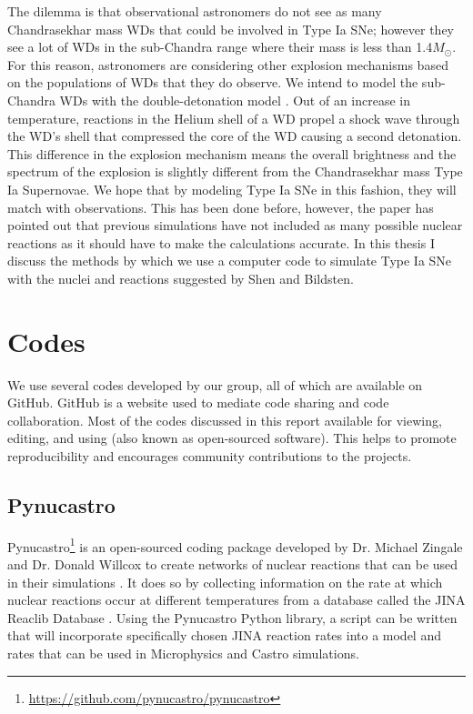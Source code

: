 \documentclass[preprint]{aastex62}
\begin{document}
  The dilemma is that observational astronomers do not see as many Chandrasekhar mass WDs that could be involved in Type Ia SNe; however they see a lot of WDs in the sub-Chandra range where their mass is less than 1.4$M_{\odot}$. For this reason, astronomers are considering other explosion mechanisms based on the populations of WDs that they do observe. We intend to model the sub-Chandra WDs with the double-detonation model \citep{doubledet1, doubledet2}. Out of an increase in temperature, reactions in the Helium shell of a WD propel a shock wave through the WD's shell that compressed the core of the WD causing a second detonation. This difference in the explosion mechanism means the overall brightness and the spectrum of the explosion is slightly different from the Chandrasekhar mass Type Ia Supernovae. We hope that by modeling Type Ia SNe in this fashion, they will match with observations. This has been done before, however, the paper \citet{shenNbildsten} has pointed out that previous simulations have not included as many possible nuclear reactions as it should have to make the calculations accurate. In this thesis I discuss the methods by which we use a computer code to simulate Type Ia SNe with the nuclei and reactions suggested by Shen and Bildsten. 

\section{Codes}
  	
    We use several codes developed by our group, all of which are available on GitHub. GitHub is a website used to mediate code sharing and code collaboration. Most of the codes discussed in this report available for viewing, editing, and using (also known as open-sourced software). This helps to promote reproducibility and encourages community contributions to the projects. 

  \subsection{Pynucastro}
    
    Pynucastro\footnote{\url{https://github.com/pynucastro/pynucastro}} is an open-sourced coding package developed by Dr. Michael Zingale and Dr. Donald Willcox to create networks of nuclear reactions that can be used in their simulations \citep{pynucastro}. It does so by collecting information on the rate at which nuclear reactions occur at different temperatures from a database called the JINA Reaclib Database \citep{JINA}. Using the Pynucastro Python library, a script can be written that will incorporate specifically chosen JINA reaction rates into a model and rates that can be used in Microphysics and Castro simulations.
  
\end{document}
